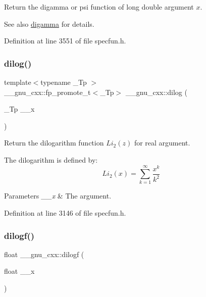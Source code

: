 Return the digamma or psi function of {\ttfamily long double} argument $ x $.

\begin{DoxySeeAlso}{See also}
\hyperlink{group__gnu__math__spec__func_ga7b87300edf8754d959e1d94fe0c9246e}{digamma} for details. 
\end{DoxySeeAlso}


Definition at line 3551 of file specfun.\+h.

\mbox{\label{group__gnu__math__spec__func_ga4185ee1a0f9189a18085f65d52b6bc9b}} 
\subsubsection{\texorpdfstring{dilog()}{dilog()}}
{\footnotesize\ttfamily template$<$typename \+\_\+\+Tp $>$ \\
\+\_\+\+\_\+gnu\+\_\+cxx\+::fp\+\_\+promote\+\_\+t$<$\+\_\+\+Tp$>$ \+\_\+\+\_\+gnu\+\_\+cxx\+::dilog (\begin{DoxyParamCaption}\item[{\+\_\+\+Tp}]{\+\_\+\+\_\+x }\end{DoxyParamCaption})\hspace{0.3cm}{\ttfamily [inline]}}

Return the dilogarithm function $ Li_2(z) $ for real argument.

The dilogarithm is defined by\+: \[ Li_2(x) = \sum_{k=1}^{\infty}\frac{x^k}{k^2} \]


\begin{DoxyParams}{Parameters}
{\em \+\_\+\+\_\+x} & The argument. \\
\hline
\end{DoxyParams}


Definition at line 3146 of file specfun.\+h.

\mbox{\label{group__gnu__math__spec__func_ga901091e0e7ce7d6113ae6a86f4865a92}} 
\subsubsection{\texorpdfstring{dilogf()}{dilogf()}}
{\footnotesize\ttfamily float \+\_\+\+\_\+gnu\+\_\+cxx\+::dilogf (\begin{DoxyParamCaption}\item[{float}]{\+\_\+\+\_\+x }\end{DoxyParamCaption})\hspace{0.3cm}{\ttfamily [inline]}}


